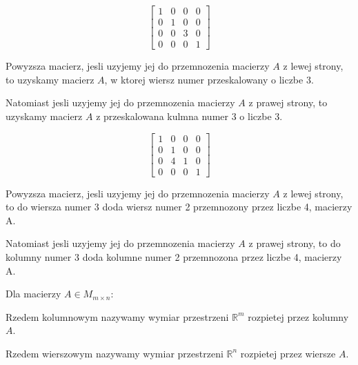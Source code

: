 \documentclass{article}
\begin{document}
\begin{tcolorbox}[colback=white!90!green,colframe=black!35!green,title=Macierze elementarne: mnozenie wiersza/kolumny przez skalar]

$$
\begin{bmatrix}
1 & 0 & 0 & 0 \\
0 & 1 & 0 & 0 \\
0 & 0 & 3 & 0 \\
0 & 0 & 0 & 1
\end{bmatrix}
$$

Powyzsza macierz, jesli uzyjemy jej do przemnozenia macierzy $A$ z lewej strony, to uzyskamy macierz $A$, w ktorej wiersz numer przeskalowany o liczbe 3.

Natomiast jesli uzyjemy jej do przemnozenia macierzy $A$ z prawej strony, to uzyskamy macierz $A$ z przeskalowana kulmna numer 3 o liczbe 3.

\end{tcolorbox}

\begin{tcolorbox}[colback=white!90!green,colframe=black!35!green,title=Macierze elementarne: dodanie wiersza/kolumny do wiersza/ kolumny]
$$
\begin{bmatrix}
1 & 0 & 0 & 0 \\
0 & 1 & 0 & 0 \\
0 & 4 & 1 & 0 \\
0 & 0 & 0 & 1  
\end{bmatrix}$$

Powyzsza macierz, jesli uzyjemy jej do przemnozenia macierzy $A$ z lewej strony, to do wiersza numer 3 doda wiersz numer 2 przemnozony przez liczbe 4, macierzy A.

Natomiast jesli uzyjemy jej do przemnozenia macierzy $A$ z prawej strony, to do kolumny numer 3 doda kolumne numer 2 przemnozona przez liczbe 4, macierzy A. 

\end{tcolorbox}

\begin{tcolorbox}[colback=white!90!red,colframe=black!35!red,title=Definicja 2.33 Rzad wierszowy i kolumnowy.]

Dla macierzy $A \in M_{m \times n}$:

Rzedem kolumnowym nazywamy wymiar przestrzeni $\mathbb{R}^{m}$ rozpietej przez kolumny $A$.

Rzedem wierszowym nazywamy wymiar przestrzeni $\mathbb{R}^{n}$ rozpietej przez wiersze $A$.
\end{tcolorbox}
\end{document}
